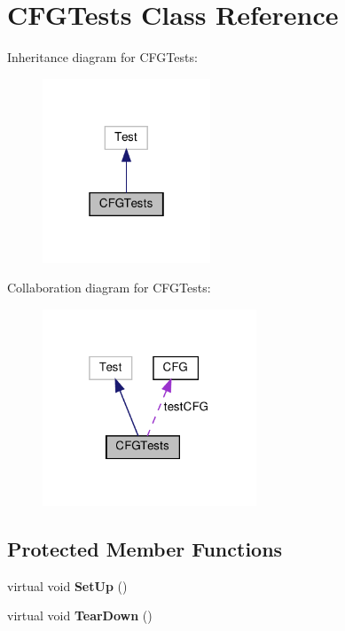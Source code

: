 \hypertarget{classCFGTests}{}\section{C\+F\+G\+Tests Class Reference}
\label{classCFGTests}


Inheritance diagram for C\+F\+G\+Tests\+:
\nopagebreak
\begin{figure}[H]
\begin{center}
\leavevmode
\includegraphics[width=142pt]{classCFGTests__inherit__graph}
\end{center}
\end{figure}


Collaboration diagram for C\+F\+G\+Tests\+:
\nopagebreak
\begin{figure}[H]
\begin{center}
\leavevmode
\includegraphics[width=181pt]{classCFGTests__coll__graph}
\end{center}
\end{figure}
\subsection*{Protected Member Functions}
\begin{DoxyCompactItemize}
\item 
\mbox{\label{classCFGTests_ace2b5e18a5d98a8e8124f2f56fbd3b29}} 
virtual void {\bfseries Set\+Up} ()
\item 
\mbox{\label{classCFGTests_a01e25be05dfab8dad0184228fec480d9}} 
virtual void {\bfseries Tear\+Down} ()
\end{DoxyCompactItemize}
